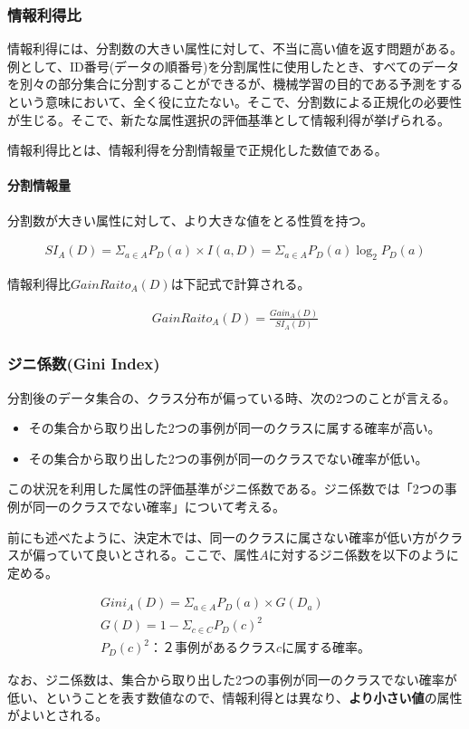 \documentclass[dvipdfmx]{jsarticle}
\begin{document}
\subsubsection{情報利得比}
情報利得には、分割数の大きい属性に対して、不当に高い値を返す問題がある。例として、ID番号(データの順番号)を分割属性に使用したとき、すべてのデータを別々の部分集合に分割することができるが、機械学習の目的である予測をするという意味において、全く役に立たない。そこで、分割数による正規化の必要性が生じる。そこで、新たな属性選択の評価基準として情報利得が挙げられる。\par
情報利得比とは、情報利得を分割情報量で正規化した数値である。
\paragraph{分割情報量}分割数が大きい属性に対して、より大きな値をとる性質を持つ。
\begin{center}
  \begin{align*}
    SI_{A}(D) = \Sigma_{a\in A}P_{D}(a) \times I(a, D) = \Sigma_{a\in A}P_{D}(a)\log_2 P_{D}(a)
  \end{align*}
\end{center}
情報利得比$GainRaito_{A}(D)$は下記式で計算される。
\begin{center}
  \begin{align*}
    GainRaito_{A}(D) = \frac{Gain_{A}(D)}{SI_{A}(D)}
  \end{align*}
\end{center}
\subsubsection{ジニ係数(Gini Index)}
分割後のデータ集合の、クラス分布が偏っている時、次の2つのことが言える。
\begin{itemize}
  \item その集合から取り出した2つの事例が同一のクラスに属する確率が高い。
  \item その集合から取り出した2つの事例が同一のクラスでない確率が低い。
\end{itemize}
この状況を利用した属性の評価基準がジニ係数である。ジニ係数では「2つの事例が同一のクラスでない確率」について考える。\par
前にも述べたように、決定木では、同一のクラスに属さない確率が低い方がクラスが偏っていて良いとされる。ここで、属性$A$に対するジニ係数を以下のように定める。
\begin{center}
  \begin{align*}
    Gini_{A}(D) = \Sigma_{a \in A}P_{D}(a) \times G(D_{a})　\\
    G(D) = 1 - \Sigma_{c \in C}P_{D}(c)^{2} \\
    P_{D}(c)^{2}：２事例があるクラスcに属する確率。
  \end{align*}
\end{center}
なお、ジニ係数は、集合から取り出した2つの事例が同一のクラスでない確率が低い、ということを表す数値なので、情報利得とは異なり、\textbf{より小さい値}の属性がよいとされる。
\end{document}
